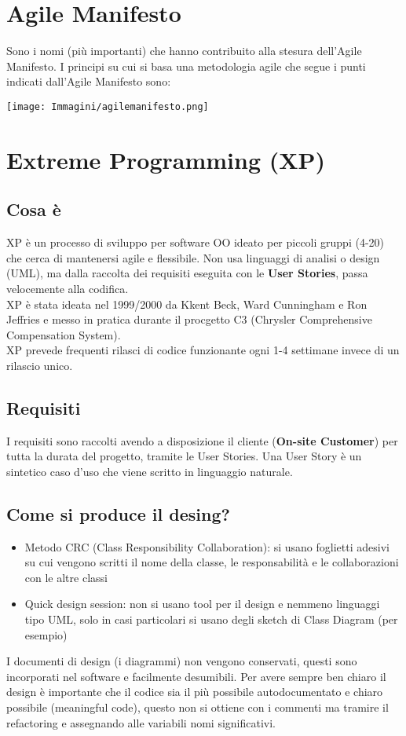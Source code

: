 \documentclass[12pt, a4paper]{report}
\begin{document}
\section{Agile Manifesto}
Sono i nomi (più importanti) che hanno contribuito alla stesura dell'Agile Manifesto. I principi su cui si basa una metodologia agile che segue i punti indicati dall'Agile Manifesto sono:
\begin{center}
    \texttt{[image: Immagini/agilemanifesto.png]}
\end{center}
\section{Extreme Programming (XP)}
\subsection{Cosa è}
XP è un processo di sviluppo per software OO ideato per piccoli gruppi (4-20) che cerca di mantenersi agile e flessibile. Non usa linguaggi di analisi o design (UML), ma dalla raccolta dei requisiti eseguita con le \textbf{User Stories}, passa velocemente alla codifica.\\
XP è stata ideata nel 1999/2000 da Kkent Beck, Ward Cunningham e Ron Jeffries e messo in pratica durante il procgetto C3 (Chrysler Comprehensive Compensation System).\\
XP prevede frequenti rilasci di codice funzionante ogni 1-4 settimane invece di un rilascio unico.
\subsection{Requisiti}
I requisiti sono raccolti avendo a disposizione il cliente (\textbf{On-site Customer}) per tutta la durata del progetto, tramite le User Stories. Una User Story è un sintetico caso d'uso che viene scritto in linguaggio naturale. 
\subsection{Come si produce il desing?}
\begin{itemize}
    \item Metodo CRC (Class Responsibility Collaboration): si usano foglietti adesivi su cui vengono scritti il nome della classe, le responsabilità e le collaborazioni con le altre classi
    \item Quick design session: non si usano tool per il design e nemmeno linguaggi tipo UML, solo in casi particolari si usano degli sketch di Class Diagram (per esempio)
\end{itemize}
I documenti  di design (i diagrammi) non vengono conservati, questi sono incorporati nel software e facilmente desumibili. Per avere sempre ben chiaro il design è importante che il codice sia il più possibile autodocumentato e chiaro possibile (meaningful code), questo non si ottiene con i commenti ma tramire il refactoring e assegnando alle variabili nomi significativi.
\end{document}
